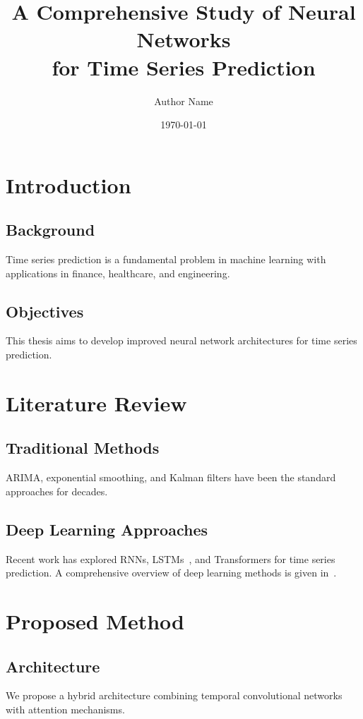 \documentclass[12pt, a4paper, oneside]{memoir}
\begin{document}
\frontmatter
\title{A Comprehensive Study of Neural Networks\\
       for Time Series Prediction}
\author{Author Name}
\date{\today}
\maketitle

\tableofcontents

\mainmatter

\chapter{Introduction}
\section{Background}
Time series prediction is a fundamental problem in
machine learning with applications in finance,
healthcare, and engineering.

\section{Objectives}
This thesis aims to develop improved neural network
architectures for time series prediction.

\chapter{Literature Review}
\section{Traditional Methods}
ARIMA, exponential smoothing, and Kalman filters
have been the standard approaches for decades.

\section{Deep Learning Approaches}
Recent work has explored RNNs, LSTMs~\cite{hochreiter1997}, and Transformers
for time series prediction. A comprehensive overview of deep learning
methods is given in~\cite{goodfellow2016}.

\chapter{Proposed Method}
\section{Architecture}
We propose a hybrid architecture combining temporal
convolutional networks with attention mechanisms.
\end{document}
